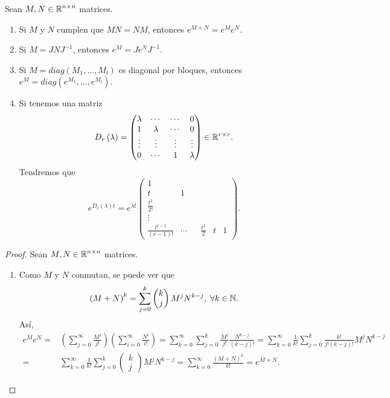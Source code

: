\begin{prop} Sean $\displaystyle M, N \in \mathbb{R} ^{n \times n} $ matrices. 
\begin{enumerate}
\item Si $\displaystyle M $ y $\displaystyle N $ cumplen que $\displaystyle M N = N M $, entonces $\displaystyle e^{M + N}=e^{M}e^{N} $. 
\item Si $\displaystyle M = JNJ^{-1} $, entonces $\displaystyle e^{M}=Je^{N}J^{-1} $. 
\item Si $\displaystyle M = diag\left(M_{1}, \ldots, M_{l}\right) $ es diagonal por bloques, entonces $\displaystyle e^{M}=diag\left(e^{M_{1}}, \ldots, e^{M_{l}}\right) $. 
\item Si tenemos una matriz 
	\[D_{r}\left(\lambda \right)=\begin{pmatrix} \lambda & \cdots & \cdots & 0 \\ 1 & \lambda & \cdots & 0 \\ \vdots & \vdots & \vdots & \vdots \\ 0 & \cdots & 1 &  \lambda  \end{pmatrix}\in \mathbb{R}^{r \times r} .\]
Tendremos que 
	\[e^{D_{r}\left(\lambda \right)t}=e^{\lambda t}\begin{pmatrix} 1 &  &  & &  \\ t & 1 &  & &  \\ \frac{t ^{2}}{2!} &  &  & &  \\ \vdots & & & & \\ \frac{t ^{r-1}}{\left(r-1\right)!} & \cdots & & \frac{t ^{2}}{2}& t& 1  \end{pmatrix}  .\]
\end{enumerate}
\end{prop}
\begin{proof}
Sean $\displaystyle M, N \in \mathbb{R}^{n \times n} $ matrices. 
\begin{enumerate}
\item Como $\displaystyle M $ y $\displaystyle N $ conmutan, se puede ver que 
	\[\left(M + N\right)^{k}= \sum^{k}_{j = 0}\begin{pmatrix} k \\ j \end{pmatrix}M^{j}N^{k-j}, \; \forall k \in \mathbb{N} .\]
	Así, 
	\[
	\begin{split}
		e^{M}e^{N} = & \left(\sum^{\infty}_{j = 0}\frac{M^{j}}{j!}\right)\left(\sum^{\infty}_{i = 0}\frac{N^{i}}{i!}\right) = \sum^{\infty }_{k = 0}\sum^{k }_{j = 0}\frac{M^{j}}{j!}\frac{N^{k-j}}{\left(k-j\right)!} = \sum^{\infty }_{k = 0}\frac{1}{k!}\sum^{k}_{j = 0}\frac{k!}{j!\left(k-j\right)!}M^{j}N^{k-j} \\
		= & \sum^{\infty}_{k = 0}\frac{1}{k!}\sum^{k}_{j = 0}\begin{pmatrix} k \\ j \end{pmatrix}M^{j}N^{k-j}=\sum^{\infty}_{k = 0}\frac{\left(M + N\right)^{k}}{k!}= e^{M + N} .
	\end{split}
	\]
\end{enumerate}
\end{proof}
